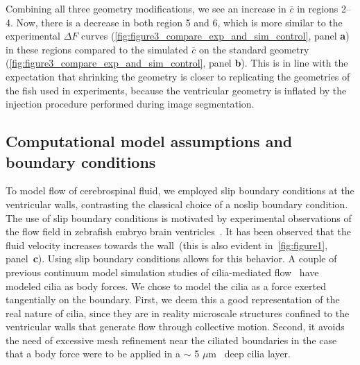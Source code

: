 \documentclass[fleqn]{wlscirep}
\begin{document}
Combining all three geometry modifications, we see an increase in $\overline{c}$ in regions 2--4. Now, there is a decrease in both region 5 and 6, which is more similar to the experimental $\Delta F$ curves (\cref{fig:figure3_compare_exp_and_sim_control}, panel \textbf{a}) in these regions compared to the simulated $\overline{c}$ on the standard geometry (\cref{fig:figure3_compare_exp_and_sim_control}, panel \textbf{b}). This is in line with the expectation that shrinking the geometry is closer to replicating the geometries of the fish used in experiments, because the ventricular geometry is inflated by the injection procedure performed during image segmentation.

\subsection*{Computational model assumptions and boundary conditions}
To model flow of cerebrospinal fluid, we employed slip boundary conditions at the ventricular walls, contrasting the classical choice of a noslip boundary condition. The use of slip boundary conditions is motivated by experimental observations of the flow field in zebrafish embryo brain ventricles~\cite{Olstad2019CiliaryDevelopment}. It has been observed that the fluid velocity increases towards the wall~(this is also evident in~\cref{fig:figure1}, panel~\textbf{c}). Using slip boundary conditions allows for this behavior. A couple of previous continuum model simulation studies of cilia-mediated flow~\cite{Siyahhan2014FlowVentricles, Thouvenin2020OriginCanal} have modeled cilia as body forces. We chose to model the cilia as a force exerted tangentially on the boundary. First, we deem this a good representation of the real nature of cilia, since they are in reality microscale structures confined to the ventricular walls that generate flow through collective motion. Second, it avoids the need of excessive mesh refinement near the ciliated boundaries in the case that a body force were to be applied in a $\sim$ 5 $\mu$m~\cite{Salman2022ComputationalEmbryo} deep cilia layer.
\end{document}
